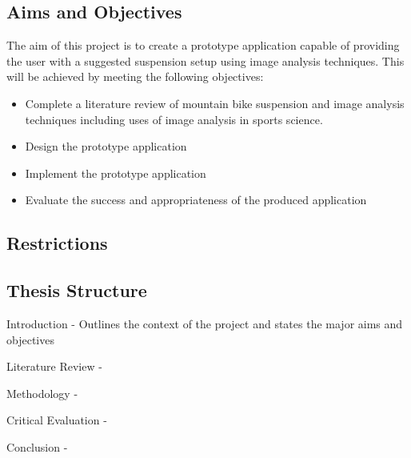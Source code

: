 \subsection{Aims and Objectives}
	The aim of this project is to create a prototype application capable of providing the user with a suggested suspension setup using image analysis techniques. This will be achieved by meeting the following objectives:
	\begin{itemize}
		\item Complete a literature review of mountain bike suspension and image analysis techniques including uses of image analysis in sports science.
		\item Design the prototype application
		\item Implement the prototype application 
		\item Evaluate the success and appropriateness of the produced application 
	\end{itemize}
\subsection{Restrictions}

\subsection{Thesis Structure}
\begin{chapterList}
	\item Introduction - Outlines the context of the project and states the major aims and objectives
	\item Literature Review - 
	\item Methodology - 
	\item Critical Evaluation - 
	\item Conclusion - 
\end{chapterList}
	